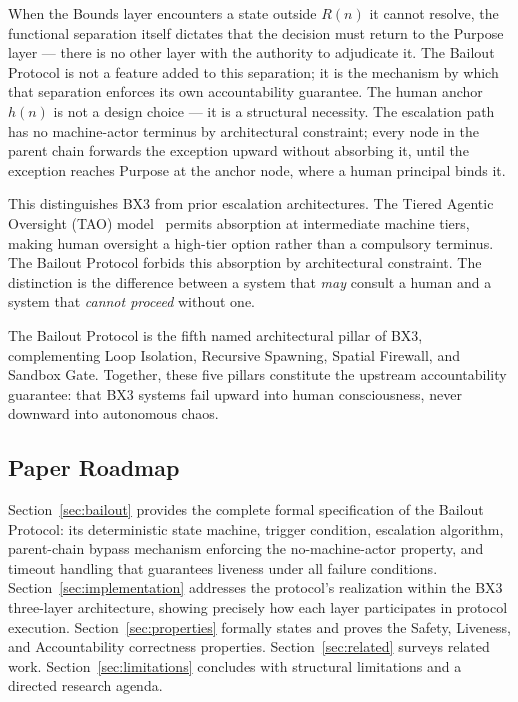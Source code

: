\documentclass{article}
\providecommand{\bxthree}{BX3}
\providecommand{\purpose}{Purpose}
\providecommand{\bounds}{Bounds}
\begin{document}
When the \bounds{} layer encounters a state outside $R(n)$ it cannot resolve, the functional separation itself dictates that the decision must return to the \purpose{} layer — there is no other layer with the authority to adjudicate it. The Bailout Protocol is not a feature added to this separation; it is the mechanism by which that separation enforces its own accountability guarantee. The human anchor $h(n)$ is not a design choice — it is a structural necessity. The escalation path has no machine-actor terminus by architectural constraint; every node in the parent chain forwards the exception upward without absorbing it, until the exception reaches \purpose{} at the anchor node, where a human principal binds it.

This distinguishes \bxthree{} from prior escalation architectures. The Tiered Agentic Oversight (TAO) model~\cite{kim2025tao} permits absorption at intermediate machine tiers, making human oversight a high-tier option rather than a compulsory terminus. The Bailout Protocol forbids this absorption by architectural constraint. The distinction is the difference between a system that \emph{may} consult a human and a system that \emph{cannot proceed} without one.

The Bailout Protocol is the fifth named architectural pillar of \bxthree{}, complementing Loop Isolation, Recursive Spawning, Spatial Firewall, and Sandbox Gate. Together, these five pillars constitute the upstream accountability guarantee: that \bxthree{} systems fail upward into human consciousness, never downward into autonomous chaos.

\subsection{Paper Roadmap}

Section~\ref{sec:bailout} provides the complete formal specification of the Bailout Protocol: its deterministic state machine, trigger condition, escalation algorithm, parent-chain bypass mechanism enforcing the no-machine-actor property, and timeout handling that guarantees liveness under all failure conditions. Section~\ref{sec:implementation} addresses the protocol's realization within the \bxthree{} three-layer architecture, showing precisely how each layer participates in protocol execution. Section~\ref{sec:properties} formally states and proves the Safety, Liveness, and Accountability correctness properties. Section~\ref{sec:related} surveys related work. Section~\ref{sec:limitations} concludes with structural limitations and a directed research agenda.
\end{document}
